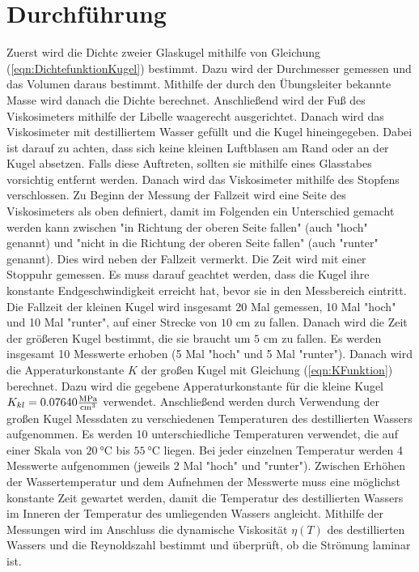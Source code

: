 \section{Durchführung}
\label{sec:Durchführung}
Zuerst wird die Dichte zweier Glaskugel mithilfe von Gleichung (\ref{eqn:DichtefunktionKugel}) bestimmt. 
Dazu wird der Durchmesser gemessen und das Volumen daraus bestimmt. Mithilfe der durch den Übungsleiter 
bekannte Masse wird danach die Dichte berechnet. 
Anschließend wird der Fuß des Viskosimeters mithilfe der Libelle waagerecht ausgerichtet. 
Danach wird das Viskosimeter mit destilliertem Wasser gefüllt und die Kugel hineingegeben. 
Dabei ist darauf zu achten, dass sich keine kleinen Luftblasen am Rand oder an der Kugel absetzen. 
Falls diese Auftreten, sollten sie mithilfe eines Glasstabes vorsichtig entfernt werden. Danach wird 
das Viskosimeter mithilfe des Stopfens verschlossen. Zu Beginn der Messung der Fallzeit wird eine Seite 
des Viskosimeters als oben definiert, damit im Folgenden ein Unterschied gemacht werden kann zwischen 
"in Richtung der oberen Seite fallen" (auch "hoch" genannt) und "nicht in die Richtung der oberen Seite fallen"
(auch "runter" genannt). Dies wird neben der Fallzeit vermerkt. Die Zeit wird mit einer Stoppuhr gemessen. 
Es muss darauf geachtet werden, dass
die Kugel ihre konstante Endgeschwindigkeit erreicht hat, bevor sie in den Messbereich eintritt. 
Die Fallzeit der kleinen Kugel wird insgesamt 20 Mal gemessen, 10 Mal "hoch" und 10 Mal "runter", auf einer Strecke von 
$10$ \unit{\centi\meter} zu fallen. Danach wird die Zeit der größeren Kugel bestimmt, 
die sie braucht um $5$ \unit{\centi\meter} zu fallen.
Es werden insgesamt 10 Messwerte erhoben (5 Mal "hoch"\,\,und 5 Mal "runter").
Danach wird die Apperaturkonstante $K$ der großen Kugel mit Gleichung (\ref{eqn:KFunktion}) berechnet. Dazu wird die gegebene 
Apperaturkonstante für die kleine Kugel $K_{kl} = 0.07640 \unit[per-mode=fraction]{\mega\pascal\per\cubic\centi\meter}$ 
verwendet. 
Anschließend werden durch Verwendung der großen Kugel Messdaten zu verschiedenen Temperaturen des 
destillierten Wassers aufgenommen. 
Es werden 10 unterschiedliche Temperaturen verwendet, die auf einer Skala von $\SI{20}{\celsius}$ bis 
$\SI{55}{\celsius}$ liegen. Bei jeder einzelnen Temperatur werden 4 Messwerte aufgenommen (jeweils 2 Mal 
"hoch" und "runter").
Zwischen Erhöhen der Wassertemperatur und dem Aufnehmen der Messwerte muss eine möglichst konstante Zeit 
gewartet werden, damit die Temperatur des destillierten Wassers im Inneren der Temperatur des umliegenden 
Wassers angleicht. 
Mithilfe der Messungen wird im Anschluss die dynamische Viskosität $\eta(T)$ des destillierten Wassers und die 
Reynoldszahl bestimmt und überprüft, ob die Strömung laminar ist.

